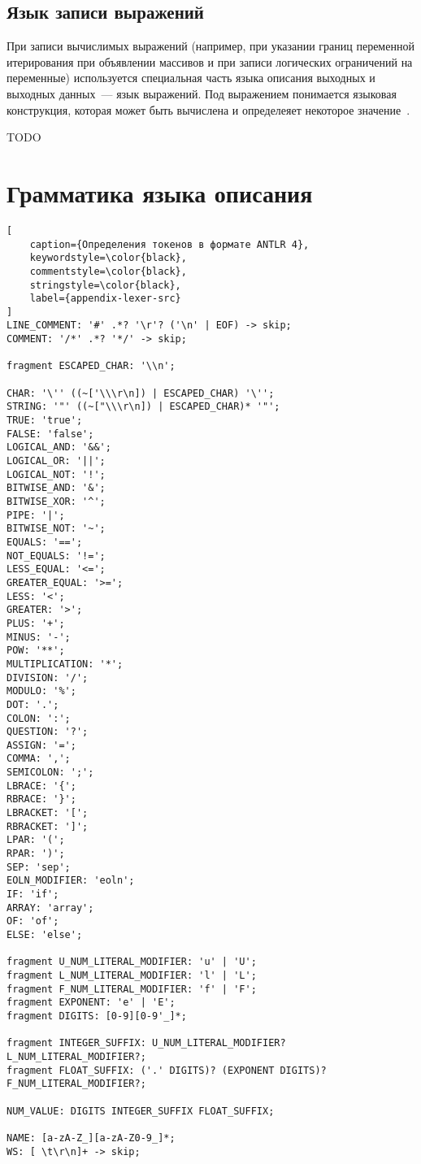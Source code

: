 \documentclass[times,specification,annotation]{style/itmo-student-thesis/itmo-student-thesis}
\begin{document}
\section{Язык записи выражений}

При записи вычислимых выражений (например, при указании границ переменной итерирования при объявлении массивов и при записи логических ограничений на переменные) используется специальная часть языка описания выходных и выходных данных~--- язык выражений. Под выражением понимается языковая конструкция, которая может быть вычислена и определеяет некоторое значение~\cite{mitchell2003concepts}.

\startconclusionpage

TODO

\printmainbibliography

\appendix

\chapter{Грамматика языка описания}\label{appendix-antlr-grammar}

\begin{lstlisting}[
    caption={Определения токенов в формате ANTLR 4},
    keywordstyle=\color{black},
    commentstyle=\color{black},
    stringstyle=\color{black},
    label={appendix-lexer-src}
]
LINE_COMMENT: '#' .*? '\r'? ('\n' | EOF) -> skip;
COMMENT: '/*' .*? '*/' -> skip;

fragment ESCAPED_CHAR: '\\n';

CHAR: '\'' ((~['\\\r\n]) | ESCAPED_CHAR) '\'';
STRING: '"' ((~["\\\r\n]) | ESCAPED_CHAR)* '"';
TRUE: 'true';
FALSE: 'false';
LOGICAL_AND: '&&';
LOGICAL_OR: '||';
LOGICAL_NOT: '!';
BITWISE_AND: '&';
BITWISE_XOR: '^';
PIPE: '|';
BITWISE_NOT: '~';
EQUALS: '==';
NOT_EQUALS: '!=';
LESS_EQUAL: '<=';
GREATER_EQUAL: '>=';
LESS: '<';
GREATER: '>';
PLUS: '+';
MINUS: '-';
POW: '**';
MULTIPLICATION: '*';
DIVISION: '/';
MODULO: '%';
DOT: '.';
COLON: ':';
QUESTION: '?';
ASSIGN: '=';
COMMA: ',';
SEMICOLON: ';';
LBRACE: '{';
RBRACE: '}';
LBRACKET: '[';
RBRACKET: ']';
LPAR: '(';
RPAR: ')';
SEP: 'sep';
EOLN_MODIFIER: 'eoln';
IF: 'if';
ARRAY: 'array';
OF: 'of';
ELSE: 'else';

fragment U_NUM_LITERAL_MODIFIER: 'u' | 'U';
fragment L_NUM_LITERAL_MODIFIER: 'l' | 'L';
fragment F_NUM_LITERAL_MODIFIER: 'f' | 'F';
fragment EXPONENT: 'e' | 'E';
fragment DIGITS: [0-9][0-9'_]*;

fragment INTEGER_SUFFIX: U_NUM_LITERAL_MODIFIER? L_NUM_LITERAL_MODIFIER?;
fragment FLOAT_SUFFIX: ('.' DIGITS)? (EXPONENT DIGITS)? F_NUM_LITERAL_MODIFIER?;

NUM_VALUE: DIGITS INTEGER_SUFFIX FLOAT_SUFFIX;

NAME: [a-zA-Z_][a-zA-Z0-9_]*;
WS: [ \t\r\n]+ -> skip;
\end{lstlisting}
\end{document}
